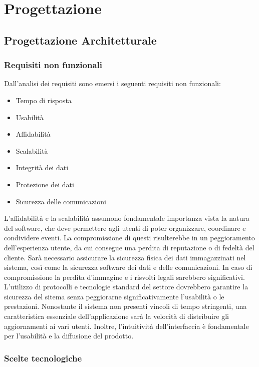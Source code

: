 \newpage
\section{Progettazione}

\subsection{Progettazione Architetturale}

\subsubsection{Requisiti non funzionali}

Dall'analisi dei requisiti sono emersi i seguenti requisiti non funzionali:
\begin{itemize}
    \item Tempo di risposta
    \item Usabilità
    \item Affidabilità
    \item Scalabilità
    \item Integrità dei dati
    \item Protezione dei dati
    \item Sicurezza delle comunicazioni
\end{itemize}

L'affidabilità e la scalabilità assumono fondamentale importanza vista la natura del software,
che deve permettere agli utenti di poter organizzare, coordinare e condividere eventi.
La compromissione di questi risulterebbe in un peggioramento dell'esperienza utente, da cui consegue una perdita di reputazione o di fedeltà del cliente.
Sarà necessario assicurare la sicurezza fisica dei dati immagazzinati nel sistema, così come la sicurezza software dei dati e delle comunicazioni.
In caso di compromissione la perdita d'immagine e i risvolti legali sarebbero significativi.
L'utilizzo di protocolli e tecnologie standard del settore dovrebbero garantire la sicurezza del sitema senza peggiorarne significativamente l'usabilità o le prestazioni.
Nonostante il sistema non presenti vincoli di tempo stringenti, una caratteristica essenziale dell'applicazione sarà la velocità di distribuire gli aggiornamenti ai vari utenti.
Inoltre, l'intuitività dell'interfaccia è fondamentale per l'usabilità e la diffusione del prodotto.

\subsubsection{Scelte tecnologiche}

